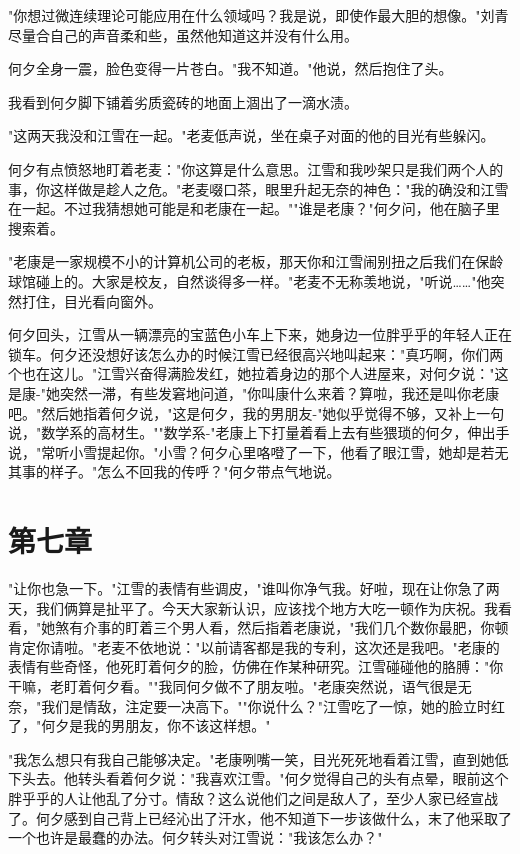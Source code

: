 \documentclass[UTF8]{ctexart}
\begin{document}
"你想过微连续理论可能应用在什么领域吗？我是说，即使作最大胆的想像。"刘青尽量合自己的声音柔和些，虽然他知道这并没有什么用。

何夕全身一震，脸色变得一片苍白。"我不知道。"他说，然后抱住了头。

我看到何夕脚下铺着劣质瓷砖的地面上涸出了一滴水渍。

"这两天我没和江雪在一起。"老麦低声说，坐在桌子对面的他的目光有些躲闪。

何夕有点愤怒地盯着老麦："你这算是什么意思。江雪和我吵架只是我们两个人的事，你这样做是趁人之危。"老麦啜口茶，眼里升起无奈的神色："我的确没和江雪在一起。不过我猜想她可能是和老康在一起。""谁是老康？"何夕问，他在脑子里搜索着。

"老康是一家规模不小的计算机公司的老板，那天你和江雪闹别扭之后我们在保龄球馆碰上的。大家是校友，自然谈得多一样。"老麦不无称羡地说，"听说……"他突然打住，目光看向窗外。

何夕回头，江雪从一辆漂亮的宝蓝色小车上下来，她身边一位胖乎乎的年轻人正在锁车。何夕还没想好该怎么办的时候江雪已经很高兴地叫起来："真巧啊，你们两个也在这儿。"江雪兴奋得满脸发红，她拉着身边的那个人进屋来，对何夕说："这是康-"她突然一滞，有些发窘地问道，"你叫康什么来着？算啦，我还是叫你老康吧。"然后她指着何夕说，"这是何夕，我的男朋友-"她似乎觉得不够，又补上一句说，"数学系的高材生。""数学系-"老康上下打量着看上去有些猥琐的何夕，伸出手说，"常听小雪提起你。"小雪？何夕心里咯噔了一下，他看了眼江雪，她却是若无其事的样子。"怎么不回我的传呼？"何夕带点气地说。

\clearpage

\section*{第七章}

"让你也急一下。"江雪的表情有些调皮，"谁叫你净气我。好啦，现在让你急了两天，我们俩算是扯平了。今天大家新认识，应该找个地方大吃一顿作为庆祝。我看看，"她煞有介事的盯着三个男人看，然后指着老康说，"我们几个数你最肥，你顿肯定你请啦。"老麦不依地说："以前请客都是我的专利，这次还是我吧。"老康的表情有些奇怪，他死盯着何夕的脸，仿佛在作某种研究。江雪碰碰他的胳膊："你干嘛，老盯着何夕看。""我同何夕做不了朋友啦。"老康突然说，语气很是无奈，"我们是情敌，注定要一决高下。""你说什么？"江雪吃了一惊，她的脸立时红了，"何夕是我的男朋友，你不该这样想。"

"我怎么想只有我自己能够决定。"老康咧嘴一笑，目光死死地看着江雪，直到她低下头去。他转头看着何夕说："我喜欢江雪。"何夕觉得自己的头有点晕，眼前这个胖乎乎的人让他乱了分寸。情敌？这么说他们之间是敌人了，至少人家已经宣战了。何夕感到自己背上已经沁出了汗水，他不知道下一步该做什么，末了他采取了一个也许是最蠢的办法。何夕转头对江雪说："我该怎么办？"
\end{document}
